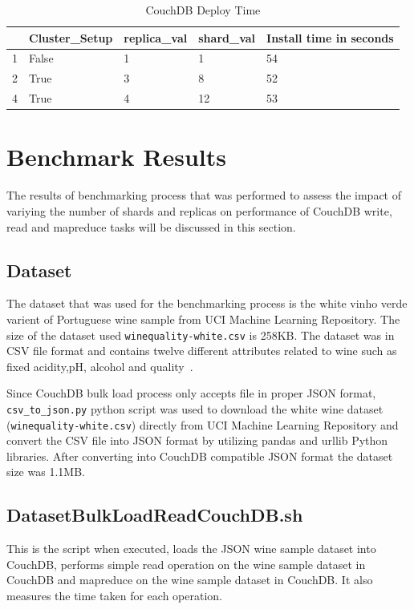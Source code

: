 \begin{table}[]
\centering
\caption{CouchDB Deploy Time}
\label{t:CouchDB-DeployTime}
\begin{tabular}{|l|l|l|l|l|}
\hline
  & \textbf{Cluster\_Setup} & \textbf{replica\_val} & \textbf{shard\_val} & \textbf{Install time in seconds} \\ \hline
1 & False                   & 1                     & 1                   & 54                               \\ \hline
2 & True                    & 3                     & 8                   & 52                               \\ \hline
4 & True                    & 4                     & 12                  & 53                               \\ \hline
\end{tabular}
\end{table}

\section{Benchmark Results}

The results of benchmarking process that was performed to assess the
impact of variying the number of shards and replicas on performance of
CouchDB write, read and mapreduce tasks will be discussed in this
section.

\subsection{Dataset}

The dataset that was used for the benchmarking process is the white
vinho verde varient of Portuguese wine sample from UCI Machine
Learning Repository. The size of the dataset used
\verb|winequality-white.csv| is 258KB. The dataset was in CSV file
format and contains twelve different attributes related to wine such
as fixed acidity,pH, alcohol and quality~\cite{www-WineQuality}.

Since CouchDB bulk load process only accepts file in proper JSON
format, \verb|csv_to_json.py| python script was used to download the
white wine dataset (\verb|winequality-white.csv|) directly from UCI
Machine Learning Repository and convert the CSV file into JSON format
by utilizing pandas and urllib Python libraries. After converting into
CouchDB compatible JSON format the dataset size was 1.1MB.

\subsection{DatasetBulkLoadReadCouchDB.sh}
This is the script when executed, loads the JSON wine sample dataset
into CouchDB, performs simple read operation on the wine sample
dataset in CouchDB and mapreduce on the wine sample
dataset in CouchDB. It also measures the time taken for each operation.

